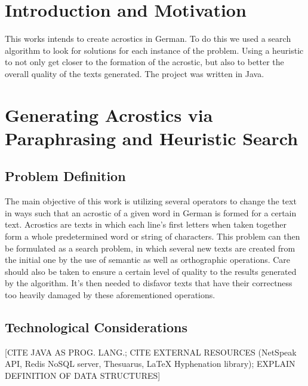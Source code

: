 \documentclass[11pt]{reportAlternative}
\begin{document}
\begin{abstract}
[ABSTRACT]
\end{abstract}

\chapter{Introduction and Motivation}
This works intends to create acrostics in German. To do this we used a search algorithm to look for solutions for each instance of the problem. Using a heuristic to not only get closer to the formation of the acrostic, but also to better the overall quality of the texts generated. The project was written in Java.

\chapter{Generating Acrostics via Paraphrasing and Heuristic Search}

\section{Problem Definition}
The main objective of this work is utilizing several operators to change the text in ways such that an acrostic of a given word in German is formed for a certain text. Acrostics are texts in which each line's first letters when taken together form a whole predetermined word or string of characters. This problem can then be formulated as a search problem, in which several new texts are created from the initial one by the use of semantic as well as orthographic operations.  Care should also be taken to ensure a certain level of quality to the results generated by the algorithm. It's then needed to disfavor texts that have their correctness too heavily damaged by these aforementioned operations.

\section{Technological Considerations}
[CITE JAVA AS PROG. LANG.; CITE EXTERNAL RESOURCES (NetSpeak API, Redis NoSQL server, Thesuarus, LaTeX Hyphenation library); EXPLAIN DEFINITION OF DATA STRUCTURES]
\end{document}
